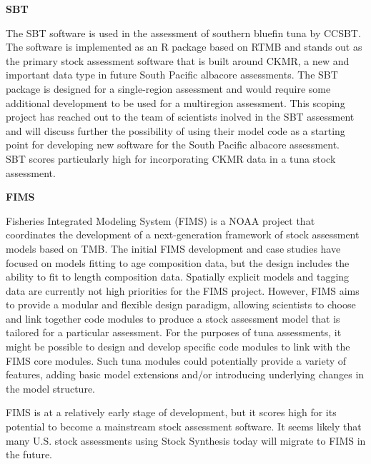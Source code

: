 \documentclass{SCreport}
\begin{document}
\vspace{1ex}

\textbf{SBT}

\vspace{-1ex}

The SBT software is used in the assessment of southern bluefin tuna by CCSBT.
The software is implemented as an R package based on RTMB and stands out as the
primary stock assessment software that is built around CKMR, a new and important
data type in future South Pacific albacore assessments. The SBT package is
designed for a single-region assessment and would require some additional
development to be used for a multiregion assessment. This scoping project has
reached out to the team of scientists inolved in the SBT assessment and will
discuss further the possibility of using their model code as a starting point
for developing new software for the South Pacific albacore assessment.\\[-4.5ex]

SBT scores particularly high for incorporating CKMR data in a tuna stock
assessment.

\vspace{1ex}

\textbf{FIMS}

\vspace{-1ex}

Fisheries Integrated Modeling System (FIMS) is a NOAA project that coordinates
the development of a next-generation framework of stock assessment models based
on TMB. The initial FIMS development and case studies have focused on models
fitting to age composition data, but the design includes the ability to fit to
length composition data. Spatially explicit models and tagging data are
currently not high priorities for the FIMS project. However, FIMS aims to
provide a modular and flexible design paradigm, allowing scientists to choose
and link together code modules to produce a stock assessment model that is
tailored for a particular assessment. For the purposes of tuna assessments, it
might be possible to design and develop specific code modules to link with the
FIMS core modules. Such tuna modules could potentially provide a variety of
features, adding basic model extensions and/or introducing underlying changes in
the model structure.

FIMS is at a relatively early stage of development, but it scores high for its
potential to become a mainstream stock assessment software. It seems likely that
many U.S. stock assessments using Stock Synthesis today will migrate to FIMS in
the future.
\end{document}
